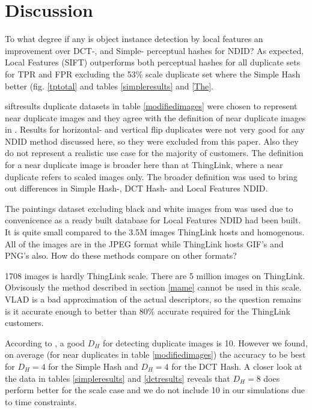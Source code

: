 \documentclass[english,12pt,a4paper,pdftex,elec,utf8]{aaltothesis}
\begin{document}
\clearpage

\section{Discussion}
To what degree if any is object instance detection by local features an improvement over DCT-, and Simple- perceptual hashes for NDID? As expected, Local Features (SIFT) outperforms both perceptual hashes for all duplicate sets for TPR and FPR excluding the 53\% scale duplicate set where the Simple Hash better (fig. \ref{tptotal} and tables \ref{simpleresults} and \ref{The}.

siftresults duplicate datasets in table \ref{modifiedimages} were chosen to represent near duplicate images and they agree with the definition of near duplicate images in \cite{Wang2013}. Results for horizontal- and vertical flip duplicates were not very good for any NDID method discussed here, so they were excluded from this paper. Also they do not represent a realistic use case for the majority of customers. The definition for a near duplicate image is broader here than at ThingLink, where a near duplicate refers to scaled images only. The broader definition was used to bring out differences in Simple Hash-, DCT Hash- and Local Features NDID.

The paintings dataset excluding black and white images from \cite{Vedaldi2012} was used due to convenicence as a ready built database for Local Features NDID had been built. It is quite small compared to the 3.5M images ThingLink hosts and homogenous. All of the images are in the JPEG format while ThingLink hosts GIF's and PNG's also. How do these methods compare on other formats?

1708 images is hardly ThingLink scale. There are 5 million images on ThingLink. Obvisously the method described in section \ref{mame} cannot be used in this scale. VLAD is a bad approximation of the actual descriptors, so the question remains is it accurate enough to better than 80\% accurate required for the ThingLink customers.

According to \cite{Zauner2010}, a good $D_H$ for detecting duplicate images is 10. However we found, on average (for near duplicates in table \ref{modifiedimages}) the accuracy to be best for $D_H = 4$ for the Simple Hash and $D_H = 4$ for the DCT Hash. A closer look at the data in tables \ref{simpleresults} and \ref{dctresults} reveals that $D_H = 8$ does perform better for the scale case and we do not include 10 in our simulations due to time constraints.
\end{document}
